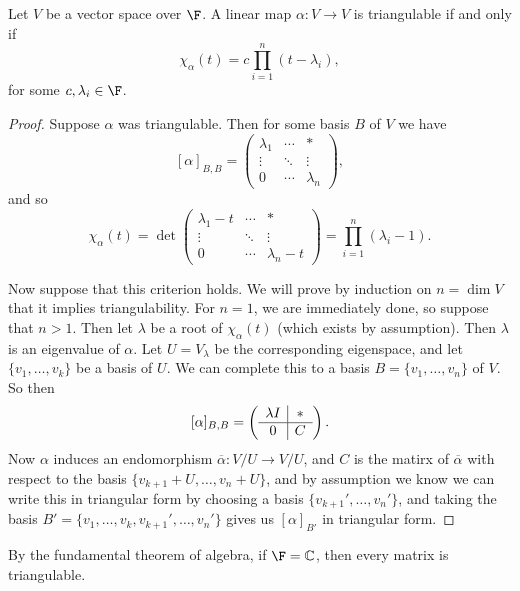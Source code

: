\documentclass[a4paper]{scrartcl}
\begin{document}
\begin{theorem}
    Let $V$ be a vector space over $\F$.
    A linear map $\alpha: V \rightarrow V$ is triangulable if and only if
    $$
    \chi_{\alpha}(t) = c \prod_{i = 1}^n (t - \lambda_i),
    $$
    for some $c, \lambda_i\in \F$.
\end{theorem}
\begin{proof}
    Suppose $\alpha$ was triangulable. Then for some basis $B$ of $V$ we have
    $$
    [\alpha]_{B, B} = \begin{pmatrix}
        \lambda_1 & \cdots & * \\
        \vdots & \ddots & \vdots \\
        0 & \cdots & \lambda_n
    \end{pmatrix}, 
    $$
    and so
    $$
    \chi_{\alpha}(t) = \det  \begin{pmatrix}
        \lambda_1 - t & \cdots & * \\
        \vdots & \ddots & \vdots \\
        0 & \cdots & \lambda_n - t
    \end{pmatrix} = \prod_{i = 1}^n(\lambda_i - 1).
    $$

    Now suppose that this criterion holds. We will prove by induction on $n = \dim V$ that it implies triangulability. For $n = 1$, we are immediately done, so suppose that $n > 1$. Then let $\lambda$ be a root of $\chi_{\alpha}(t)$ (which exists by assumption). Then $\lambda$ is an eigenvalue of $\alpha$. Let $U = V_\lambda$ be the corresponding eigenspace, and let $\{v_1, \dots, v_k\}$ be a basis of $U$. We can complete this to a basis $B = \{v_1, \dots, v_n\}$ of $V$. So then
    $$
    [\alpha]_{B, B} = \left(\begin{array}{ c | c }
                \lambda I & *\\
                \hline
                0 & C
              \end{array}\right).
    $$
    Now $\alpha$ induces an endomorphism $\overline{\alpha} : V / U \rightarrow V / U$, and $C$ is the matirx of $\overline{\alpha}$ with respect to the basis $\{v_{k + 1} + U, \dots, v_n + U\}$, and by assumption we know we can write this in triangular form by choosing a basis $\{v_{k + 1}', \dots, v_n'\}$, and taking the basis $B' = \{v_1, \dots, v_k, v_{k + 1}', \dots, v_n'\}$ gives us $[\alpha]_{B'}$ in triangular form.
\end{proof}
\begin{remark}
    By the fundamental theorem of algebra, if $\F = \mathbb{C}$, then every matrix is triangulable.
\end{remark}
\end{document}
